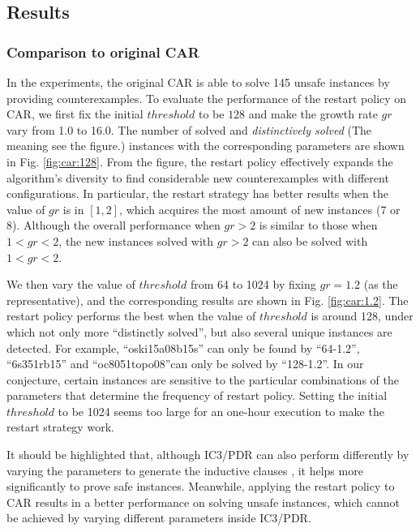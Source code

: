 \subsection{Results}

\subsubsection{Comparison to original CAR}
In the experiments, the original CAR is able to solve 145 unsafe instances by providing counterexamples.
To evaluate the performance of the restart policy on CAR, we first fix the initial $threshold$ to be $128$ and make the growth rate $gr$ vary from 1.0 to 16.0. The number of solved and \emph{distinctively solved} (The meaning see the figure.) instances with the corresponding parameters are shown in Fig. \ref{fig:car:128}. From the figure, the restart policy effectively expands the algorithm's diversity to find considerable new counterexamples with different configurations. In particular, the restart strategy has better results when the value of $gr$ is in $[1, 2]$, which acquires the most amount of new instances (7 or 8). Although the overall performance when $gr>2$ is similar to those when $1<gr<2$, the new instances solved with $gr>2$ can also be solved with $1<gr<2$. 


We then vary the value of $threshold$ from 64 to 1024 by fixing $gr=1.2$ (as the representative), and the corresponding results are shown in 
Fig. \ref{fig:car:1.2}. The restart policy performs the best when the value of $threshold$ is around 128, under which not only more ``distinctly solved'', but also several unique instances are detected. For example, ``oski15a08b15s'' can only be found by ``64-1.2'', ``6s351rb15'' and ``oc8051topo08''can only be solved by ``128-1.2''. In our conjecture, certain instances are sensitive to the particular combinations of the parameters that determine the frequency of restart policy. Setting the initial $threshold$ to be 1024 seems too large for an one-hour execution to make the restart strategy work. 

It should be highlighted that, although IC3/PDR can also perform differently by varying the parameters to generate the inductive clauses \cite{GR16}, it helps more significantly to prove safe instances. Meanwhile, applying the restart policy to CAR results in a better performance on solving unsafe instances, which cannot be achieved by varying different parameters inside IC3/PDR. 

